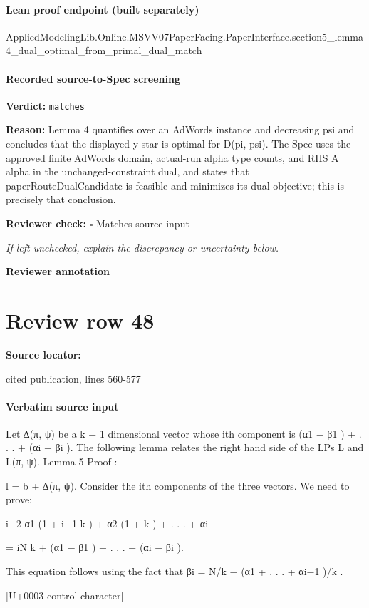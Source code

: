 \documentclass[10pt]{article}
\newcommand{\reviewerbox}{%
  \par\noindent\fbox{\parbox{0.96\linewidth}{\rule{0pt}{0.38in}}}\par
}
\newcommand{\reviewmatch}[1]{%
  \par\noindent\textbf{Reviewer check:} $\square$\; #1\par
  \noindent\emph{If left unchecked, explain the discrepancy or uncertainty below.}\par
}
\begin{document}
\paragraph{Lean proof endpoint (built separately)}\begin{ReviewVerbatim}
AppliedModelingLib.Online.MSVV07PaperFacing.PaperInterface.section5_lemma4_dual_optimal_from_primal_dual_match
\end{ReviewVerbatim}

\paragraph{Recorded source-to-Spec screening}
\textbf{Verdict:} \texttt{matches}
\\
{\raggedright
\textbf{Reason:} Lemma 4 quantifies over an AdWords instance and decreasing psi and concludes that the displayed y-\allowbreak{}star is optimal for D(pi, psi).\allowbreak{} The Spec uses the approved finite AdWords domain, actual-\allowbreak{}run alpha type counts, and RHS A alpha in the unchanged-\allowbreak{}constraint dual, and states that paperRouteDualCandidate is feasible and minimizes its dual objective;\allowbreak{} this is precisely that conclusion.\allowbreak{}
\par}
\reviewmatch{Matches source input}
\noindent\textbf{Reviewer annotation}\par
\reviewerbox
\clearpage
\hypertarget{source-claim-550ad01ce2e2cdce}{}
\section*{Review row 48}
\textbf{Source locator:} {\footnotesize\raggedright cited publication, lines 560-\allowbreak{}577\par}
\paragraph{Verbatim source input}
\begin{ReviewVerbatim}
Let ∆(π, ψ) be a k − 1 dimensional vector whose ith component is (α1 − β1 ) + . . . + (αi − βi ).
The following lemma relates the right hand side of the LPs L and L(π, ψ).
Lemma 5
Proof :

l = b + ∆(π, ψ).
Consider the ith components of the three vectors. We need to prove:

i−2
α1 (1 + i−1
k ) + α2 (1 + k ) + . . . + αi

= iN
k + (α1 − β1 ) + . . . + (αi − βi ).

This equation follows using the fact that βi = N/k − (α1 + . . . + αi−1 )/k .

[U+0003 control character]
\end{ReviewVerbatim}
\end{document}
